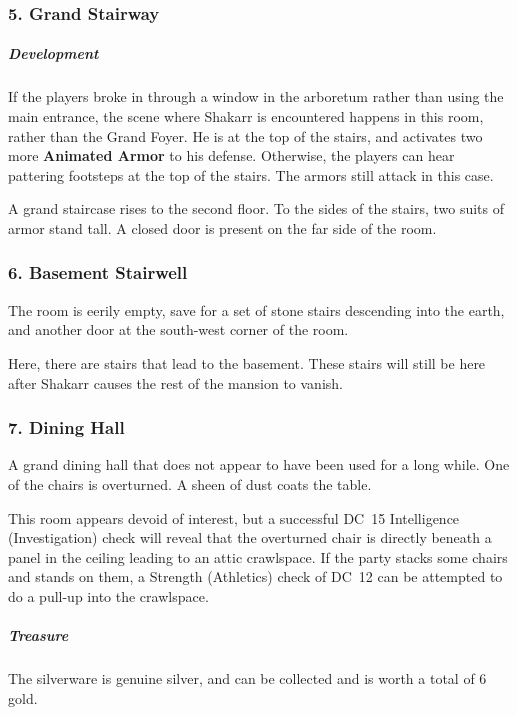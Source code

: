 \subsubsection{5. Grand Stairway}
\subparagraph{Development}
If the players broke in through a window in the arboretum rather than using the main entrance, the scene where Shakarr is encountered happens in this room, rather than the Grand Foyer. He is at the top of the stairs, and activates two more \textbf{Animated Armor} to his defense. Otherwise, the players can hear pattering footsteps at the top of the stairs. The armors still attack in this case.
\begin{DndReadAloud}
  A grand staircase rises to the second floor. To the sides of the stairs, two suits of armor stand tall. A closed door is present on the far side of the room.
\end{DndReadAloud}
\subsubsection{6. Basement Stairwell}
\begin{DndReadAloud}
    The room is eerily empty, save for a set of stone stairs descending into the earth, and another door at the south-west corner of the room.
\end{DndReadAloud}
Here, there are stairs that lead to the basement. These stairs will still be here after Shakarr causes the rest of the mansion to vanish.
\subsubsection{7. Dining Hall}
\begin{DndReadAloud}
    A grand dining hall that does not appear to have been used for a long while. One of the chairs is overturned. A sheen of dust coats the table.
\end{DndReadAloud}
This room appears devoid of interest, but a successful DC~15 Intelligence (Investigation) check will reveal that the overturned chair is directly beneath a panel in the ceiling leading to an attic crawlspace. If the party stacks some chairs and stands on them, a Strength (Athletics) check of DC~12 can be attempted to do a pull-up into the crawlspace.
\subparagraph{Treasure} The silverware is genuine silver, and can be collected and is worth a total of 6 gold.
